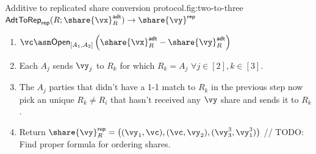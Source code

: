 \begin{Boxfig}{Additive to replicated share conversion
protocol.}{fig:two-to-three}{$\mathsf{AdtToRep}_\mathsf{rep}(R;
\share{\vx}^{\mathsf{adt}}_{R}) \rightarrow \share{\vy}^\mathsf{rep}$}
\begin{enumerate}
\item $\vc \asn \mathsf{Open}_{[A_1, A_2]}\left( \share{\vx}^{\mathsf{adt}}_{R}
- \share{\vy}^{\mathsf{adt}}_{R} \right)$
\item Each $A_j$ sends $\vy_j$ to $R_k$ for which $R_k = A_j$ $\forall j \in [2], k \in [3]$.
\item The $A_j$ parties that didn't have a 1-1 match to $R_k$ in the previous step now pick an unique $R_k \neq R_i$
that hasn't received any $\vy$ share and sends it to $R_k$.
\item Return $\share{\vy}^{\mathsf{rep}}_{R} = \left( (\vy_1, \vc), (\vc, \vy_2), (\vy_3^3, \vy_1^3) \right)$ // TODO: Find proper formula for ordering shares.
\end{enumerate}
\end{Boxfig}


